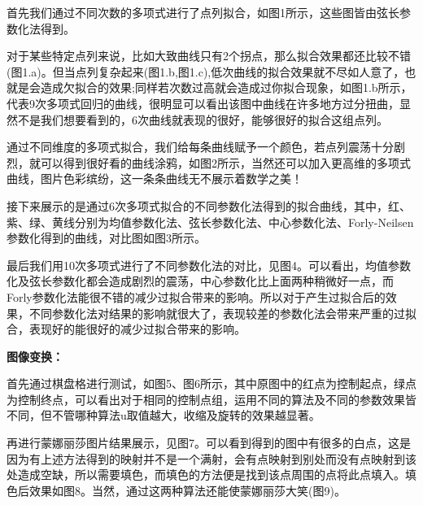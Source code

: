 \documentclass{article}
\begin{document}
    首先我们通过不同次数的多项式进行了点列拟合，如图1所示，这些图皆由弦长参数化法得到。
    
    对于某些特定点列来说，比如大致曲线只有2个拐点，那么拟合效果都还比较不错(图1.a)。但当点列复杂起来(图1.b,图1.c),低次曲线的拟合效果就不尽如人意了，也就是会造成欠拟合的效果;同样若次数过高就会造成过你拟合现象，如图1.b所示，代表9次多项式回归的曲线，很明显可以看出该图中曲线在许多地方过分扭曲，显然不是我们想要看到的，6次曲线就表现的很好，能够很好的拟合这组点列。
    
    通过不同维度的多项式拟合，我们给每条曲线赋予一个颜色，若点列震荡十分剧烈，就可以得到很好看的曲线涂鸦，如图2所示，当然还可以加入更高维的多项式曲线，图片色彩缤纷，这一条条曲线无不展示着数学之美！
    
    接下来展示的是通过6次多项式拟合的不同参数化法得到的拟合曲线，其中，红、紫、绿、黄线分别为均值参数化法、弦长参数化法、中心参数化法、Forly-Neilsen参数化得到的曲线，对比图如图3所示。
    
    最后我们用10次多项式进行了不同参数化法的对比，见图4。可以看出，均值参数化及弦长参数化都会造成剧烈的震荡，中心参数化比上面两种稍微好一点，而Forly参数化法能很不错的减少过拟合带来的影响。所以对于产生过拟合后的效果，不同参数化法对结果的影响就很大了，表现较差的参数化法会带来严重的过拟合，表现好的能很好的减少过拟合带来的影响。
    
    \textbf{图像变换：}
    
    首先通过棋盘格进行测试，如图5、图6所示，其中原图中的红点为控制起点，绿点为控制终点，可以看出对于相同的控制点组，运用不同的算法及不同的参数效果皆不同，但不管哪种算法u取值越大，收缩及旋转的效果越显著。
    
    再进行蒙娜丽莎图片结果展示，见图7。可以看到得到的图中有很多的白点，这是因为有上述方法得到的映射并不是一个满射，会有点映射到别处而没有点映射到该处造成空缺，所以需要填色，而填色的方法便是找到该点周围的点将此点填入。填色后效果如图8。当然，通过这两种算法还能使蒙娜丽莎大笑(图9)。
        
    
\end{document}
